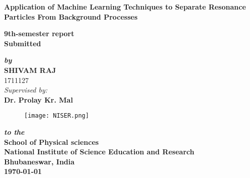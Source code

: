 \begin{changemargin}{0cm}{0cm}
\thispagestyle{empty}
\baselineskip25pt
\begin{center}
{\Large {\bf Application of Machine Learning Techniques to Separate Resonance Particles From Background Processes}}\\
\end{center}

\vfill
\begin{center}
{\textbf{ 9th-semester report \\Submitted}} \\
\end{center}
\baselineskip25pt

\vfill
\begin{center} {\bf {\em by}} \\
{\large{\bf SHIVAM RAJ}\\
1711127}\\


{{ \textit{ Supervised by:} }}\\
{\large{\bf Dr. Prolay Kr. Mal}}\\
\end{center}

\vfill
\begin{center}
\begin{figure}[h!]
\centering
\texttt{[image: NISER.png]}
\end{figure}
 {\bf {\em to the }} \\
{\bf {\large School of Physical sciences}} \\
{\bf {\large National Institute of Science Education and Research}} \\
{\bf Bhubaneswar, India} \\
{\bf \today} 
\end{center}
\end{changemargin}


